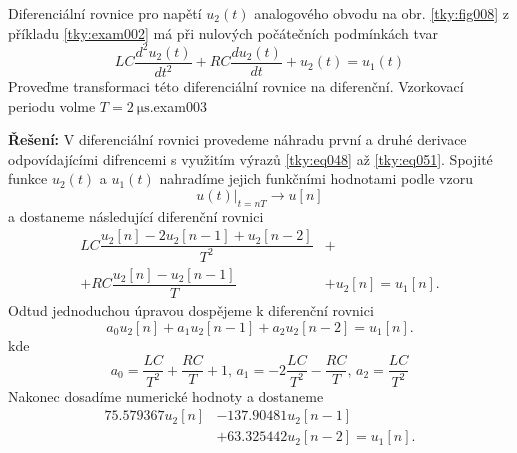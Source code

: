 \begin{tkyexam}{Diferenciální rovnice pro napětí \(u_2(t)\) analogového obvodu na obr.
  \ref{tky:fig008} z příkladu \ref{tky:exam002} má při nulových počátečních podmínkách tvar
  \begin{equation*}
    LC\frac{d^2u_2(t)}{dt^2}+RC\frac{du_2(t)}{dt}+u_2(t)=u_1(t)
  \end{equation*}
  Proveďme transformaci této diferenciální rovnice na diferenční. Vzorkovací periodu volme \(T =
  \qty{2}{\us}\).}{exam003}

  \noindent\textbf{Řešení:}
  V diferenciální rovnici provedeme náhradu první a druhé derivace odpovídajícími difrencemi s
  využitím výrazů \ref{tky:eq048} až \ref{tky:eq051}. Spojité funkce \(u_2(t)\) a \(u_1(t)\)
  nahradíme jejich funkčními hodnotami podle vzoru
  \begin{equation*}
    \left.u(t)\right\rvert_{t=nT}  \rightarrow u[n]
  \end{equation*}
  a dostaneme následující diferenční rovnici
  \begin{align*}
      LC\dfrac{u_2[n] - 2u_2[n-1]    + u_2[n-2]}{T^2} &+      \\
    + RC\dfrac{u_2[n] - u_2[n-1]}{T}                  &+ u_2[n]=u_1[n]. 
  \end{align*}
  Odtud jednoduchou úpravou dospějeme k diferenční rovnici
  \begin{equation*}
    a_0u_2[n] + a_1u_2[n-1] + a_2u_2[n-2]=u_1[n].
  \end{equation*}
  kde
  \begin{equation*}
    a_0 = \frac{LC}{T^2} + \frac{RC}{T} + 1, \, a_1 = -2\frac{LC}{T^2} - \frac{RC}{T}, \,  
    a_2 = \frac{LC}{T^2}
  \end{equation*}
  Nakonec dosadíme numerické hodnoty a dostaneme
  \begin{align}
    \num{75.579367}u_2[n] &- \num{137.90481}u_2[n-1]                       \nonumber \\
                          &+ \num{63.325442}u_2[n-2] = u_1[n].             \label{tky:eq061}
  \end{align}
\end{tkyexam}